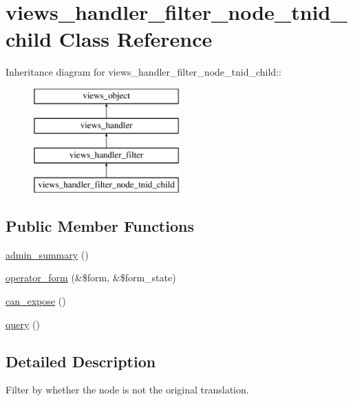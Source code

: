 \hypertarget{classviews__handler__filter__node__tnid__child}{
\section{views\_\-handler\_\-filter\_\-node\_\-tnid\_\-child Class Reference}
\label{classviews__handler__filter__node__tnid__child}
}
Inheritance diagram for views\_\-handler\_\-filter\_\-node\_\-tnid\_\-child::\begin{figure}[H]
\begin{center}
\leavevmode
\includegraphics[height=4cm]{classviews__handler__filter__node__tnid__child}
\end{center}
\end{figure}
\subsection*{Public Member Functions}
\begin{CompactItemize}
\item 
\hyperlink{classviews__handler__filter__node__tnid__child_3762760577c3801276a683271be90e47}{admin\_\-summary} ()
\item 
\hyperlink{classviews__handler__filter__node__tnid__child_e0cfa82e361de74d4f24f820f5106117}{operator\_\-form} (\&\$form, \&\$form\_\-state)
\item 
\hyperlink{classviews__handler__filter__node__tnid__child_2c6527f01666eaf0ba38eff4798ec732}{can\_\-expose} ()
\item 
\hyperlink{classviews__handler__filter__node__tnid__child_a21b64d11f0f79a113be65b65e6249e0}{query} ()
\end{CompactItemize}


\subsection{Detailed Description}
Filter by whether the node is not the original translation. 

